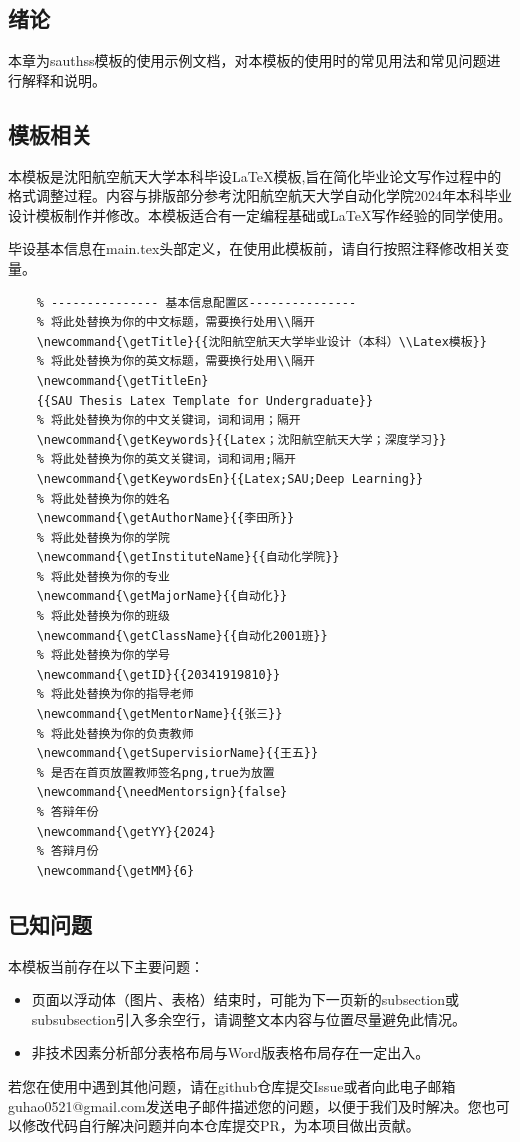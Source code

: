 \begin{thesischapter}
    \section{绪论}
    本章为sauthss模板的使用示例文档，对本模板的使用时的常见用法和常见问题进行解释和说明。
    \subsection{模板相关}
    本模板是沈阳航空航天大学本科毕设\LaTeX 模板,旨在简化毕业论文写作过程中的格式调整过程。内容与排版部分参考沈阳航空航天大学自动化学院2024年本科毕业设计模板制作并修改。本模板适合有一定编程基础或\LaTeX 写作经验的同学使用。\par
    毕设基本信息在main.tex头部定义，在使用此模板前，请自行按照注释修改相关变量。\par
    \begin{Verbatim}
    % --------------- 基本信息配置区--------------- 
    % 将此处替换为你的中文标题，需要换行处用\\隔开
    \newcommand{\getTitle}{{沈阳航空航天大学毕业设计（本科）\\Latex模板}}
    % 将此处替换为你的英文标题，需要换行处用\\隔开
    \newcommand{\getTitleEn}
    {{SAU Thesis Latex Template for Undergraduate}}
    % 将此处替换为你的中文关键词，词和词用；隔开
    \newcommand{\getKeywords}{{Latex；沈阳航空航天大学；深度学习}}
    % 将此处替换为你的英文关键词，词和词用;隔开
    \newcommand{\getKeywordsEn}{{Latex;SAU;Deep Learning}}
    % 将此处替换为你的姓名
    \newcommand{\getAuthorName}{{李田所}}
    % 将此处替换为你的学院
    \newcommand{\getInstituteName}{{自动化学院}}
    % 将此处替换为你的专业
    \newcommand{\getMajorName}{{自动化}}
    % 将此处替换为你的班级
    \newcommand{\getClassName}{{自动化2001班}}
    % 将此处替换为你的学号
    \newcommand{\getID}{{20341919810}}
    % 将此处替换为你的指导老师
    \newcommand{\getMentorName}{{张三}}
    % 将此处替换为你的负责教师
    \newcommand{\getSupervisiorName}{{王五}}
    % 是否在首页放置教师签名png,true为放置
    \newcommand{\needMentorsign}{false}
    % 答辩年份
    \newcommand{\getYY}{2024}
    % 答辩月份
    \newcommand{\getMM}{6}
    \end{Verbatim}
    \subsection{已知问题}
    本模板当前存在以下主要问题：
    \begin{itemize}
        \item 页面以浮动体（图片、表格）结束时，可能为下一页新的subsection或subsubsection引入多余空行，请调整文本内容与位置尽量避免此情况。\par
        \item 非技术因素分析部分表格布局与Word版表格布局存在一定出入。\par
    \end{itemize}\par
    若您在使用中遇到其他问题，请在github仓库提交Issue或者向此电子邮箱guhao0521@gmail.com发送电子邮件描述您的问题，以便于我们及时解决。您也可以修改代码自行解决问题并向本仓库提交PR，为本项目做出贡献。\par

\end{thesischapter}
